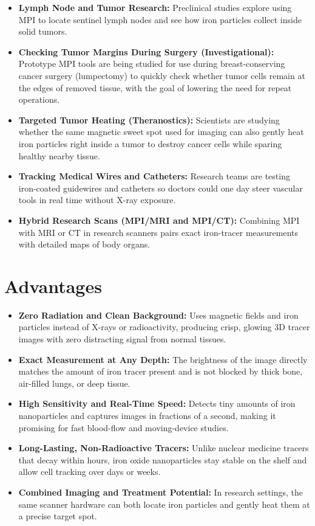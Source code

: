 \begin{itemize}
    \item \textbf{Lymph Node and Tumor Research:} Preclinical studies explore using MPI to locate sentinel lymph nodes and see how iron particles collect inside solid tumors.
    \item \textbf{Checking Tumor Margins During Surgery (Investigational):} Prototype MPI tools are being studied for use during breast-conserving cancer surgery (lumpectomy) to quickly check whether tumor cells remain at the edges of removed tissue, with the goal of lowering the need for repeat operations.
    \item \textbf{Targeted Tumor Heating (Theranostics):} Scientists are studying whether the same magnetic sweet spot used for imaging can also gently heat iron particles right inside a tumor to destroy cancer cells while sparing healthy nearby tissue.
    \item \textbf{Tracking Medical Wires and Catheters:} Research teams are testing iron-coated guidewires and catheters so doctors could one day steer vascular tools in real time without X-ray exposure.
    \item \textbf{Hybrid Research Scans (MPI/MRI and MPI/CT):} Combining MPI with MRI or CT in research scanners pairs exact iron-tracer measurements with detailed maps of body organs.
\end{itemize}

\section{Advantages}

\begin{itemize}
    \item \textbf{Zero Radiation and Clean Background:} Uses magnetic fields and iron particles instead of X-rays or radioactivity, producing crisp, glowing 3D tracer images with zero distracting signal from normal tissues.
    \item \textbf{Exact Measurement at Any Depth:} The brightness of the image directly matches the amount of iron tracer present and is not blocked by thick bone, air-filled lungs, or deep tissue.
    \item \textbf{High Sensitivity and Real-Time Speed:} Detects tiny amounts of iron nanoparticles and captures images in fractions of a second, making it promising for fast blood-flow and moving-device studies.
    \item \textbf{Long-Lasting, Non-Radioactive Tracers:} Unlike nuclear medicine tracers that decay within hours, iron oxide nanoparticles stay stable on the shelf and allow cell tracking over days or weeks.
    \item \textbf{Combined Imaging and Treatment Potential:} In research settings, the same scanner hardware can both locate iron particles and gently heat them at a precise target spot.
\end{itemize}


